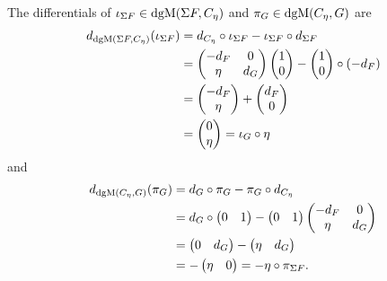 \begin{remark}
    The differentials of \( \iota_{\Sigma F} \in \operatorname{dgM}(\Sigma F, C_{\eta}) \) and \( \pi_G \in \operatorname{dgM}(C_{\eta}, G) \) are
    \begin{align*}
        d_{\operatorname{dgM}(\Sigma F, C_{\eta})}(\iota_{\Sigma F}) &= d_{C_{\eta}} \circ \iota_{\Sigma F} - \iota_{\Sigma F} \circ d_{\Sigma F} \\
        &=
        \begin{pmatrix}
            -d_F & 0 \\
            \eta & d_G
        \end{pmatrix}
        \begin{pmatrix}
            1 \\
            0
        \end{pmatrix}
        -
        \begin{pmatrix}
            1 \\
            0
        \end{pmatrix}
        \circ (- d_F) \\
        &=
        \begin{pmatrix}
            -d_F \\
            \eta
        \end{pmatrix}
        +
        \begin{pmatrix}
            d_F \\
            0
        \end{pmatrix} \\
        &=
        \begin{pmatrix}
            0 \\
            \eta
        \end{pmatrix}
        = \iota_G \circ \eta
    \end{align*}
    and
    \begin{align*}
        d_{\operatorname{dgM}(C_{\eta}, G)}(\pi_G) &= d_G \circ \pi_G - \pi_G \circ d_{C_{\eta}} \\
        &= d_G \circ
        \begin{pmatrix}
            0 & 1
        \end{pmatrix}
        -
        \begin{pmatrix}
            0 & 1
        \end{pmatrix}
        \begin{pmatrix}
            -d_F & 0 \\
            \eta & d_G
        \end{pmatrix} \\
        &=
        \begin{pmatrix}
            0 & d_G
        \end{pmatrix}
        -
        \begin{pmatrix}
            \eta & d_G
        \end{pmatrix} \\
        &= -
        \begin{pmatrix}
            \eta & 0
        \end{pmatrix}
        = - \eta \circ \pi_{\Sigma F}.
    \end{align*}
\end{remark}

